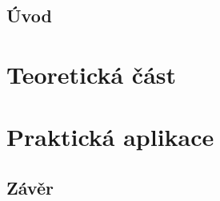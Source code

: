 \documentclass[twoside]{ctuthesis}
\theoremstyle{plainit}
\theoremstyle{definition}
\theoremstyle{note}
\begin{document}
\maketitle


\chapter{Úvod}


\part{Teoretická část}


\part{Praktická aplikace}



\chapter{Závěr}
\lipsum[1]
 










\appendix

\printnomenclature

\printindex



\end{document}
